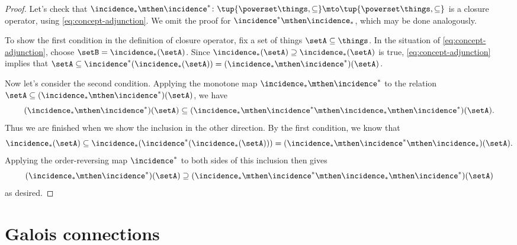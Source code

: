 \begin{proof}
Let's check that $\incidence_* \mthen \incidence^* \colon \tup{\powerset \things, \subseteq} \mto \tup{\powerset \things, \subseteq}$ is a closure operator, using \cref{eq:concept-adjunction}. We omit the proof for $\incidence^* \mthen \incidence_*$, which may be done analogously. 


To show the first condition in the definition of closure operator, fix a set of things $\setA \subseteq \things$. In the situation of \cref{eq:concept-adjunction}, choose $\setB = \incidence_*(\setA)$. Since $\incidence_*(\setA) \supseteq \incidence_*(\setA)$ is true, \cref{eq:concept-adjunction} implies that $\setA \subseteq \incidence^*(\incidence_*(\setA))  = (\incidence_* \mthen \incidence^*)(\setA)$. 

Now let's consider the second condition. Applying the monotone map $\incidence_* \mthen \incidence^*$ to the relation $\setA \subseteq (\incidence_* \mthen \incidence^*)(\setA)$, we have
\begin{equation}
(\incidence_* \mthen \incidence^*)(\setA)  \subseteq  (\incidence_* \mthen \incidence^* \mthen \incidence_* \mthen \incidence^*)(\setA).
\end{equation}
Thus we are finished when we show the inclusion in the other direction. By the first condition, we know that 
\begin{equation}
\incidence_*(\setA) \subseteq \incidence_*( \incidence^* (\incidence_*(\setA))) = (\incidence_* \mthen \incidence^* \mthen \incidence_*)(\setA).
\end{equation}
Applying the order-reversing map $\incidence^*$ to both sides of this inclusion then gives 
\begin{equation}
(\incidence_* \mthen \incidence^*)(\setA) \supseteq (\incidence_* \mthen \incidence^* \mthen \incidence_* \mthen \incidence^*)(\setA)
\end{equation}
as desired. 
\end{proof}


\section{Galois connections}\label{subsec:galois-connections}

